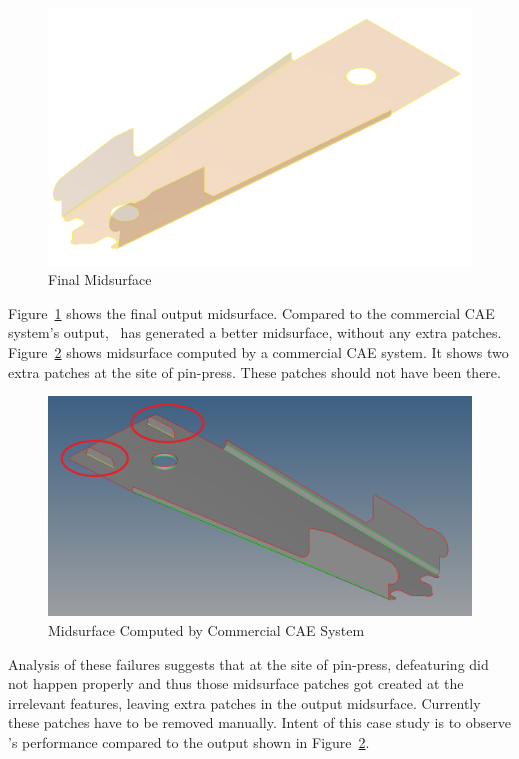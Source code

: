 \begin{figure}[!h]
\centering     %
\includegraphics[width=0.62\linewidth,valign=t]{../Common/images/StaplerLower_finalmidsurf_model}
\caption{Final Midsurface}
\label{fig:results:staplerlowerfinalmidsurf}
\end{figure}


Figure~\ref{fig:results:staplerlowerfinalmidsurf} shows the final output midsurface. Compared to the commercial CAE system's output, \mysystemname~has generated a better midsurface, without any extra patches. Figure~\ref{fig:results:staplerlowerhm} shows midsurface computed by a commercial CAE system. It shows two extra patches at the site of pin-press. These patches should not have been there.


\begin{figure}[!h]
\centering     %
\includegraphics[width=0.62\linewidth,valign=t]{../Common/images/StaplerLower_HMFails_EmbossPin_1_model}
\caption{Midsurface Computed by Commercial CAE System}
\label{fig:results:staplerlowerhm}
\end{figure}





Analysis of these failures suggests that at the site of pin-press, defeaturing did not happen properly and thus those midsurface patches got created at the irrelevant features, leaving extra patches in the output midsurface. Currently these patches have to be removed manually. Intent of this case study is to observe \mysystemname's performance compared to the output shown in Figure~\ref{fig:results:staplerlowerhm}.

